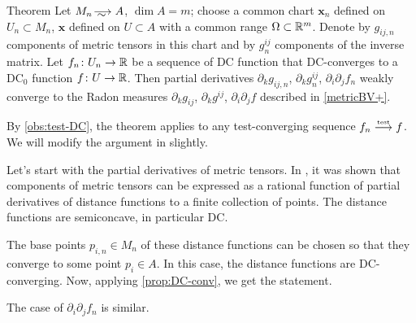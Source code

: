 \begin{thm}{Theorem}\label{metricBV}
Let $M_n\smooths{} A$, $\dim A=m$; choose a common chart $\bm{x}_n$ defined on $U_n\subset M_n$, $\bm{x}$ defined on $U\subset A$ with a common range $\Omega\subset \mathbb{R}^m$.
Denote by $g_{ij,n}$ components of metric tensors in this chart
and by $g^{ij}_n$ components of the inverse matrix. 
Let $f_n\colon U_n\to \mathbb{R}$ be a sequence of DC function that DC-converges to a DC$_0$ function $f\colon U\to \mathbb{R}$.
Then partial derivatives $\partial_k g_{ij,n}$, $\partial_k g^{ij}_n$, $\partial_i\partial_jf_n$ weakly converge to the Radon measures $\partial_k g_{ij}$, $\partial_k g^{ij}$, $\partial_i\partial_jf$ described in \ref{metricBV+}.
\end{thm}

By \ref{obs:test-DC}, the theorem applies to any test-converging sequence $f_n\zz\testto f$.
We will modify the argument in \cite[Section 4]{PerDC} slightly.


Let's start with the partial derivatives of metric tensors.
In \cite[Subsection 4.2]{PerDC}, it was shown that components of metric tensors can be expressed as a rational function of partial derivatives of distance functions to a finite collection of points.
The distance functions are semiconcave, in particular DC.

The base points $p_{i,n}\in M_n$ of these distance functions can be chosen so that they converge to some point $p_i\in A$.
In this case, the distance functions are DC-converging.
Now, applying \ref{prop:DC-conv}, we get the statement.

The case of $\partial_i\partial_jf_n$ is similar.
\qeds






